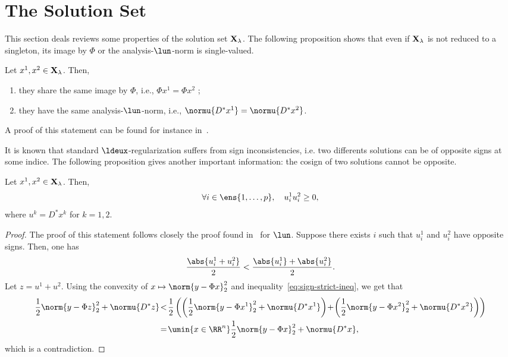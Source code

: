 \section{The Solution Set}
\label{sec:sol}

This section deals reviews some properties of the solution set $\mathbf{X}_{\lambda}$.
The following proposition shows that even if $\mathbf{X}_{\lambda}$ is not reduced to a singleton, its image by $\Phi$ or the analysis-$\lun$-norm is single-valued.
\begin{proposition}\label{lem:same-image}
  Let $x^1, x^2 \in \mathbf{X}_{\lambda}$.
  Then,
  \begin{enumerate}
  \item they share the same image by $\Phi$, i.e., $\Phi x^1 = \Phi x^2$ ;
  \item they have the same analysis-$\lun$-norm, i.e., $\normu{D^* x^1} = \normu{D^* x^2}$.
  \end{enumerate}
\end{proposition}
A proof of this statement can be found for instance in~\cite{vaiter2011robust}.

It is known that standard $\ldeux$-regularization suffers from sign inconsistencies, i.e. two differents solutions can be of opposite signs at some indice.
The following proposition gives another important information: the cosign of two solutions cannot be opposite.
\begin{proposition}\label{prop:sign}
  Let $x^1, x^2 \in \mathbf{X}_{\lambda}$.
  Then,
  \begin{equation*}
    \forall i \in \ens{1,\dots,p}, \quad u_i^1 u_i^2 \geq 0 ,
  \end{equation*}
  where $u^k = D^* x^k$ for $k=1,2$.
\end{proposition}
\begin{proof}
  The proof of this statement follows closely the proof found in~\cite{attouch1999p} for $\lun$.
  Suppose there exists $i$ such that $u_i^1$ and $u_i^2$ have opposite signs.
  Then, one has
  \begin{equation}\label{eq:sign-strict-ineq}
    \frac{\abs{u_i^1 + u_i^2}}{2} < \frac{\abs{u_i^1} + \abs{u_i^2}}{2} .
  \end{equation}
  Let $z = u^1 + u^2$.
  Using the convexity of $x \mapsto \norm{y - \Phi x}_2^2$ and inequality~\eqref{eq:sign-strict-ineq}, we get that
  \begin{align*}
    \frac{1}{2} \norm{y - \Phi z}_2^2 + \normu{D^* z} 
    & \!<\! \frac{1}{2} \left( \left( \frac{1}{2} \norm{y - \Phi x^1}_2^2 + \normu{D^* x^1}  \right) \!+\! \left( \frac{1}{2} \norm{y - \Phi x^2}_2^2 + \normu{D^* x^2} \right) \right) \\
    & \!=\! \umin{x \in \RR^n} \frac{1}{2} \norm{y - \Phi x}_2^2 + \normu{D^* x} ,
  \end{align*}
  which is a contradiction.
\end{proof}

